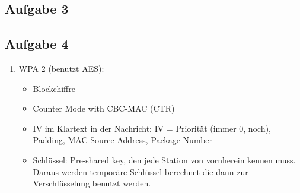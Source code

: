 \documentclass[12pt]{article}
\begin{document}
\subsection*{Aufgabe 3}
\subsection*{Aufgabe 4}
\begin{enumerate}
\item WPA 2 (benutzt AES): \begin{itemize}\item Blockchiffre \item Counter Mode with CBC-MAC (CTR) \item IV im Klartext in der Nachricht: IV = Priorität (immer 0, noch), Padding, MAC-Source-Address, Package Number \item Schlüssel: Pre-shared key, den jede Station von vornherein kennen muss. Daraus werden temporäre Schlüssel berechnet die dann zur Verschlüsselung benutzt werden. \end{itemize}

\end{enumerate}
\end{document}

